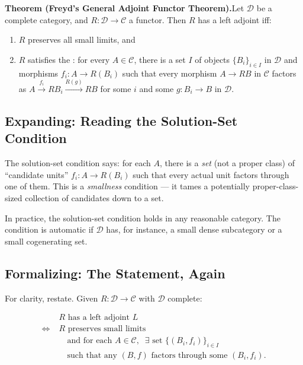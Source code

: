 \textbf{Theorem (Freyd's General Adjoint Functor Theorem).}\quad Let
$\mathcal{D}$ be a complete category, and $R : \mathcal{D} \to \mathcal{C}$
a functor. Then $R$ has a left adjoint iff:

\begin{enumerate}
  \item $R$ preserves all small limits, and
  \item $R$ satisfies the : for every
        $A \in \mathcal{C}$, there is a set $I$ of objects
        $\{B_i\}_{i \in I}$ in $\mathcal{D}$ and morphisms
        $f_i : A \to R(B_i)$ such that every morphism $A \to R B$ in
        $\mathcal{C}$ factors as $A \xrightarrow{f_i} R B_i
        \xrightarrow{R(g)} R B$ for some $i$ and some $g : B_i \to B$
        in $\mathcal{D}$.
\end{enumerate}

\subsection{Expanding: Reading the Solution-Set Condition}

The solution-set condition says: for each $A$, there is a \emph{set} (not
a proper class) of ``candidate units'' $f_i : A \to R(B_i)$ such that
every actual unit factors through one of them. This is a
\emph{smallness} condition --- it tames a potentially proper-class-sized
collection of candidates down to a set.

In practice, the solution-set condition holds in any reasonable
category. The condition is automatic if $\mathcal{D}$ has, for instance,
a small dense subcategory or a small cogenerating set.

\subsection{Formalizing: The Statement, Again}

For clarity, restate. Given $R : \mathcal{D} \to \mathcal{C}$ with
$\mathcal{D}$ complete:

\begin{align*}
  & R \text{ has a left adjoint } L \\
  \iff\;
  & R \text{ preserves small limits} \\
  & \quad \text{and for each } A \in \mathcal{C},
    \;\; \exists \text{ set } \{(B_i, f_i)\}_{i \in I} \\
  & \quad \text{such that any } (B, f) \text{ factors through some } (B_i, f_i).
\end{align*}

